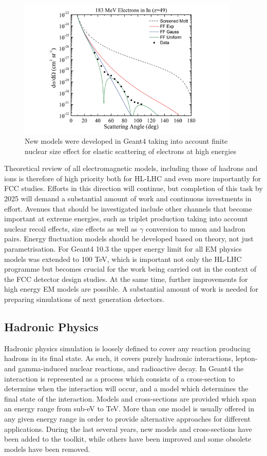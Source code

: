 \documentclass[12pt,a4paper]{article}
\begin{document}
\begin{figure}[bthp]
\centering
\includegraphics[width=0.94\textwidth]{image8.png}
\caption{New models were developed in Geant4 taking into account
finite nuclear size effect for elastic scattering of electrons at high
energies}
\label{fig:newm}
\end{figure}

Theoretical review of all electromagnetic models, including those of
hadrons and ions is therefore of high priority both for HL-LHC and even
more importantly for FCC studies. Efforts in this direction will
continue, but completion of this task by 2025 will demand a substantial
amount of work and continuous investments in effort. Avenues that should
be investigated include other channels that become important at extreme
energies, such as triplet production taking into account nuclear recoil
effects, size effects as well as $\gamma$ conversion to muon and hadron pairs.
Energy fluctuation models should be developed based on theory, not just
parametrisation. For Geant4 10.3 the upper energy limit for all EM
physics models was extended to 100 TeV, which is important not only the
HL-LHC programme but becomes crucial for the work being carried out in
the context of the FCC detector design studies. At the same time,
further improvements for high energy EM models are possible. A
substantial amount of work is needed for preparing simulations of next
generation detectors.

\hypertarget{hadronic-physics}{%
\subsection{Hadronic Physics}\label{hadronic-physics}}

Hadronic physics simulation is loosely defined to cover any reaction
producing hadrons in its final state. As such, it covers purely hadronic
interactions, lepton- and gamma-induced nuclear reactions, and
radioactive decay. In Geant4 the interaction is represented as a process
which consists of a cross-section to determine when the interaction will
occur, and a model which determines the final state of the interaction.
Models and cross-sections are provided which span an energy range from
sub-eV to TeV. More than one model is usually offered in any given
energy range in order to provide alternative approaches for different
applications. During the last several years, new models and
cross-sections have been added to the toolkit, while others have been
improved and some obsolete models have been removed.
\end{document}
